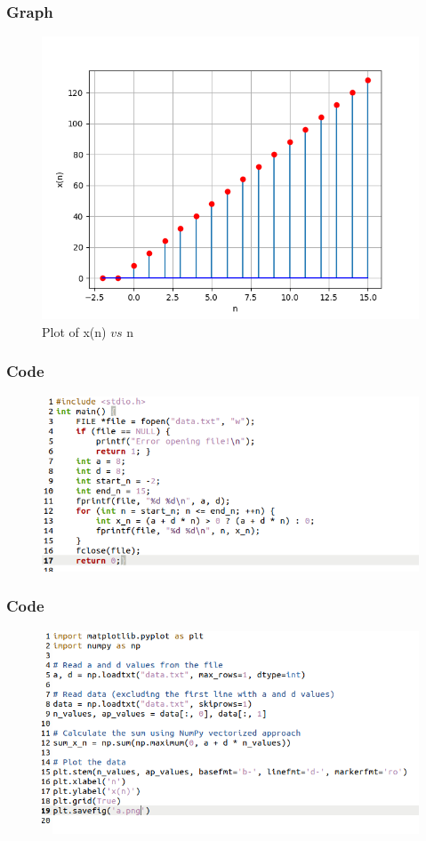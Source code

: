 \documentclass{beamer}
\begin{document}
\begin{frame}
\frametitle{Graph}
\begin{figure}[ht]
        \centering
        \includegraphics[width=\columnwidth]{figs/a.png}
        \caption{Plot of x(n) $vs$ n}
        \label{fig:10.5.3.13.1}
    \end{figure}
\end{frame}

\begin{frame}
\frametitle{Code}
\begin{figure}[ht]
                        \centering
                        \includegraphics[width=\columnwidth]{figs/1.png}
                        \label{fig:1.a}
\end{figure}
\end{frame}

\begin{frame}
\frametitle{Code}
\begin{figure}[ht]
                        \centering
                        \includegraphics[width=\columnwidth]{figs/2.png}
                        \label{fig:1.b}
\end{figure}
\end{frame}
\end{document}
